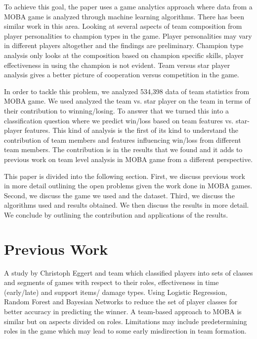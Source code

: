 \documentclass[conference]{IEEEtran}
\begin{document}
To achieve this goal, the paper uses a game analytics approach where data from a MOBA game is analyzed through machine learning algorithms. There has been similar work in this area. Looking at several aspects of team composition from player personalities to champion types in the game. Player personalities may vary in different players altogether and the findings are preliminary. Champion type analysis only looks at the composition based on champion specific skills, player effectiveness in using the champion is not evident. Team versus star player analysis gives a better picture of cooperation versus competition in the game.  

In order to tackle this problem, we analyzed 534,398 data of team statistics from MOBA game. We used analyzed the team vs. star player on the team in terms of their contribution to winning/losing. To answer that we turned this into a classification question where we predict win/loss based on team features vs. star-player features. This kind of analysis is the first of its kind to understand the contribution of team members and features influencing win/loss from different team members. The contribution is in the results that we found and it adds to previous work on team level analysis in MOBA game from a different perspective. 

This paper is divided into the following section. First, we discuss previous work in more detail outlining the open problems given the work done in MOBA games. Second, we discuss the game we used and the dataset. Third, we discuss the algorithms used and results obtained. We then discuss the results in more detail. We conclude by outlining the contribution and applications of the results.  



\section{Previous Work}
A study by Christoph Eggert and team \cite{Eggert2015} which classified players into sets of classes and segments of games with respect to their roles, effectiveness in time (early/late) and support items/ damage types. Using Logistic Regression, Random Forest and Bayesian Networks to reduce the set of player classes for better accuracy in predicting the winner. A team-based approach to MOBA is similar but on aspects divided on roles. Limitations may include predetermining roles in the game which may lead to some early misdirection in team formation.
\end{document}
